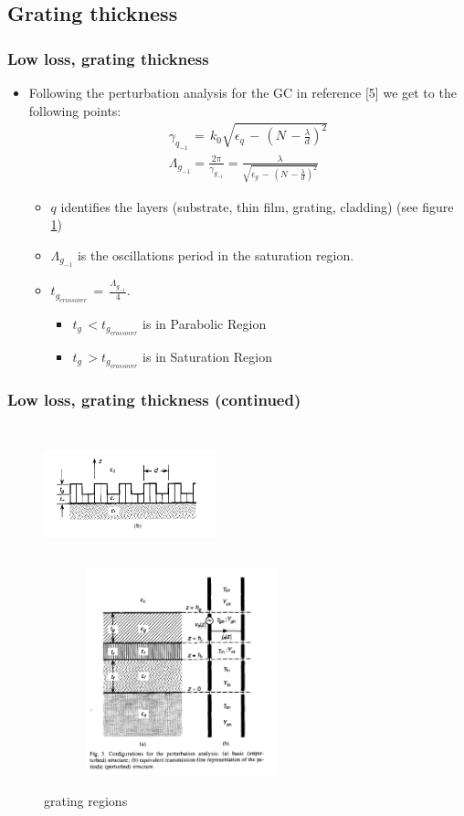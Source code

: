 \documentclass{beamer}
\begin{document}
\begin{frame}
\subsection{Grating thickness}
\frametitle{Low loss, grating thickness}
\begin{itemize}
\item  Following the perturbation analysis for the GC in reference [5] we  get to the following points:
\begin{eqnarray*}
\gamma_{q_{-1}} \, = \, k_0\sqrt{\epsilon_q \, - \, (N \, - \frac{\lambda}{d})^2 } \\
\Lambda_{g_{-1}} = \frac{2\pi}{\gamma_{g_{-1}} } =  \frac{\lambda}{\sqrt{\epsilon_g \, - \, (N \, - \frac{\lambda}{d})^2}  } 
\end{eqnarray*}
    \begin{itemize}
    \item $q$ identifies the layers (substrate, thin film, grating, cladding) (see figure \ref{gratingRegion1})
    \item $\Lambda_{g_{-1}}$ is the oscillations period in the saturation region.
    \item $t_{g_{cross over}} \, = \, \frac{\Lambda_{g_{-1}}}{4} $. 
    	\begin{itemize}
	\item $t_g \, < t_{g_{cross over}} $ is in Parabolic Region
	\item $t_g \, > t_{g_{cross over}} $ is in Saturation Region
	\end{itemize}
    \end{itemize}
\end{itemize}
\end{frame}
%
\begin{frame}
\frametitle{Low loss, grating thickness (continued)}
\begin{figure}[H]
\begin{center}
\includegraphics[width=5cm, height=4cm]{Figures/gratingStruc} 
\includegraphics[width=8cm, height=6cm]{Figures/perturbationAnalysis}
\caption{grating regions}
\label{gratingRegion1}
\end{center}
\end{figure}
\end{frame}
%
\end{document}
